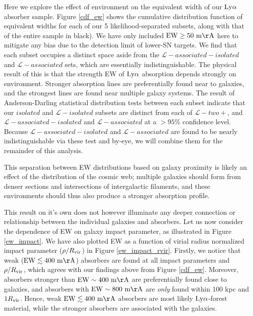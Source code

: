 \documentclass[twocolumn,tighten]{aastex62}
\begin{document}
Here we explore the effect of environment on the equivalent width of our $\rm Ly\alpha$ absorber sample. Figure \ref{cdf_ew} shows the cumulative distribution function of equivalent widths for each of our 5 likelihood-separated subsets, along with that of the entire sample in black). We have only included $\rm EW \ge 50~m\AA$ here to mitigate any bias due to the detection limit of lower-SN targets. We find that each subset occupies a distinct space aside from the $\mathcal{L}-associated-isolated$ and $\mathcal{L}-associated$ sets, which are essentially indistinguishable. The physical result of this is that the strength EW of $\rm Ly\alpha$ absorption depends strongly on environment. Stronger absorption lines are preferentially found near to galaxies, and the strongest lines are found near multiple galaxy systems. The result of Anderson-Darling statistical distribution tests between each subset indicate that our $isolated$ and $\mathcal{L}-isolated$ subsets are distinct from each of $\mathcal{L}-two+$, and $\mathcal{L}-associated-isolated$ and $\mathcal{L}-associated$ at a $>95\%$ confidence level. Because $\mathcal{L}-associated-isolated$ and $\mathcal{L}-associated$ are found to be nearly indistinguishable via these test and by-eye, we will combine them for the remainder of this analysis.


This separation between EW distributions based on galaxy proximity is likely an effect of the distribution of the cosmic web; multiple galaxies should form from denser sections and intersections of intergalactic filaments, and these environments should thus also produce a stronger absorption profile. 


This result on it's own does not however illuminate any deeper connection or relationship between the individual galaxies and absorbers. Let us now consider the dependence of EW on galaxy impact parameter, as illustrated in Figure \ref{ew_impact}. We have also plotted EW as a function of virial radius normalized impact parameter ($\rho/ R_{\rm vir}$) in Figure \ref{ew_impact_rvir}. Firstly, we notice that weak ($\rm EW \lesssim 400~m\AA$) absorbers are found at all impact parameters and $\rho / R_{\rm vir}$, which agrees with our findings above from Figure \ref{cdf_ew}. Moreover, absorbers stronger than $\rm EW \sim 400~m\AA$ are preferentially found close to galaxies, and absorbers with $\rm EW \sim 800~m\AA$ are \emph{only} found within 100 kpc and $1 R_{\rm vir}$. Hence, weak $\rm EW \lesssim 400~m\AA$ absorbers are most likely $\rm Ly\alpha$-forest material, while the stronger absorbers are associated with the galaxies.
\end{document}
